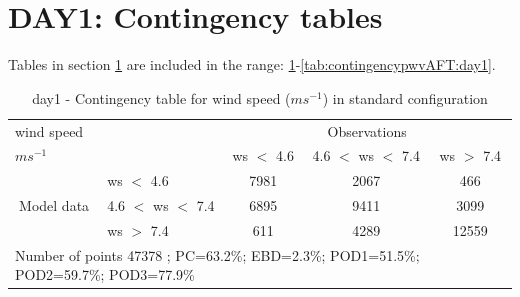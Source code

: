 \section{DAY1: Contingency tables}\label{sec:day1:cont}
Tables in section \ref{sec:day1:cont} are included in the range: \ref{tab:contingencywsBEF:day1}-\ref{tab:contingencypwvAFT:day1}.
\begin{table}[h!]
\begin{center}
\begin{tabular}{llccc}
\hline
{wind speed}                                       &                                                    & \multicolumn{3}{c}{Observations}                 \\
{$m s^{-1}$}                                       &                             & ws $<$ 4.6   & 4.6 $<$ ws $<$ 7.4 & ws $>$ 7.4 \\
\hline
\multicolumn{1}{c}{\multirow{3}{*}{Model data}}  & ws $<$ 4.6             & 7981                & 2067                       & 466              \\
                                                 & 4.6  $<$ ws $<$ 7.4 & 6895                & 9411                       & 3099              \\
                                                 & ws $>$ 7.4             & 611                & 4289                       & 12559              \\
\hline 
\multicolumn{5}{l}{ Number of points        47378 ; PC=63.2\%; EBD=2.3\%; POD1=51.5\%; POD2=59.7\%; POD3=77.9\%}                 \\
\end{tabular}
\end{center}
\caption{day1 - Contingency table for {wind speed} ($m s^{-1}$) in standard configuration}
\label{tab:contingencywsBEF:day1}
\end{table}
